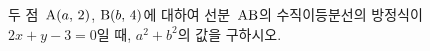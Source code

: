 두 점~$\mathrm{A}(a,\,2)$, $\mathrm{B}(b,\,4)$에 대하여 선분~$\mathrm{AB}$의 수직이등분선의 방정식이 $2x+y-3=0$일 때, $a^2+b^2$의 값을 구하시오.
